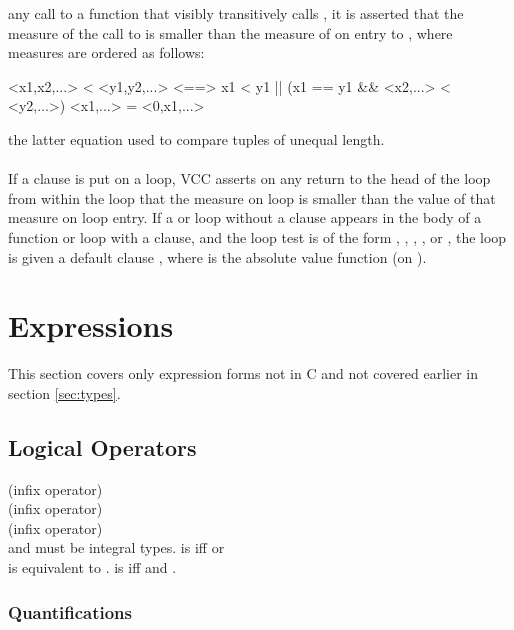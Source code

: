 \documentclass[preprint,nocopyrightspace]{sigplanconf}
\begin{document}
{{{any call to a function  that visibly transitively calls ,
it is asserted that the measure of the call to  is smaller
than the measure of  on entry to , where measures are
ordered as follows:
\begin{VCC}
<x1,x2,...> < <y1,y2,...> <==> x1 < y1 || (x1 == y1 && <x2,...> < <y2,...>)
<x1,...> = <0,x1,...>
\end{VCC}
the latter equation used to compare tuples of unequal length.
\\\\
If a  clause is put on a loop, VCC asserts on any
return to the head of the loop from within the loop that the measure
on loop is smaller than the value of that measure on loop entry. If a
 or  loop without a  clause appears in the body of a function
or loop with a  clause, and the loop test is of the
form , , , ,
or , the loop is given a default clause 
, where  is the absolute value function
(on \vcc{\integer}). 


\section{Expressions}
This section covers only expression forms not in C and not covered
earlier in section \ref{sec:types}.

\subsection{Logical Operators}

 (infix operator) \\
 (infix operator)\\
 (infix operator)\\
 and  must be integral types. 
 is \vcc{\true} iff  or \\
 is equivalent to .
 is \vcc{\true} iff  and .

\subsubsection{Quantifications}

}}}
\end{document}

